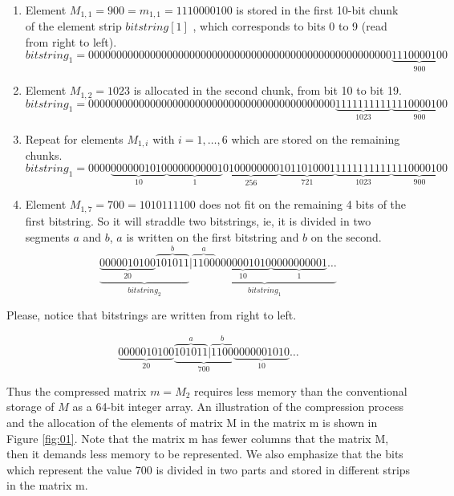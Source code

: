 \documentclass[10pt]{article}
\begin{document}
\begin{enumerate}
 \item Element $M_{1,1}=900 = m_{1,1} = 1110000100$ is stored in the first 
10-bit chunk of the element strip $bitstring[1]$ , which corresponds to bits 0 
to 9 (read from right to left). 
\begin{equation*}\label{eq:04}
bitstring_1 = 000000000000000000000000000000000000000000000000000000\underbrace{1110000100}_{900} 
\end{equation*}
 \item Element $M_{1,2}=1023$ is allocated in the second chunk, from bit 10 to 
bit 19. 
\begin{equation*}\label{eq:05}
 bitstring_1 = 00000000000000000000000000000000000000000000\underbrace{1111111111}_{1023}\underbrace{1110000100}_{900} 
\end{equation*}
 \item Repeat for elements $M_{1,i}$ with $i=1,\ldots,6$ which are stored on the 
remaining chunks. 
 \begin{equation*}\label{eq:06}
bitstring_1 = 0000\underbrace{0000001010}_{10}\underbrace{0000000001}_{1}\underbrace{0100000000}_{256}\underbrace{1011010001}_{721}\underbrace{1111111111}_{1023}\underbrace{1110000100}_{900} 
 \end{equation*}
 \item Element $M_{1,7}=700=1010111100$ does not fit on the remaining 4 bits of 
the first bitstring. So it will straddle two bitstrings, ie, it is divided in 
two segments $a$ and $b$, $a$ is written on the first bitstring and $b$ on the 
second.
 \begin{equation*}\label{eq:07}
  \underbrace{\underbrace{0000010100}_{20}\overbrace{101011}^{b}}_{bitstring_2}|\underbrace{\overbrace{1100}^{a}\underbrace{0000001010}_{10}\underbrace{0000000001}_{1}\hdots}_{bitstring_1}
\end{equation*}
\end{enumerate}

 Please, notice that bitstrings are written from right to left.

\begin{equation*}\label{eq:8}
  \underbrace{0000010100}_{20}\underbrace{\overbrace{101011}^a|\overbrace{1100}^{b}}_{700}\underbrace{0000001010}_{10}\ldots
\end{equation*}

Thus the compressed matrix $m = M_2$ requires less memory than the conventional 
storage of $M$ as a 64-bit integer array. An illustration of the compression 
process and the allocation of the elements of matrix M in the matrix m is shown 
in Figure \ref{fig:01}. Note that the matrix m has fewer columns that the 
matrix M, then it demands less memory to be represented. We also emphasize that 
the bits which represent the value 700 is divided in two parts and stored in 
different strips in the matrix m.
\end{document}
